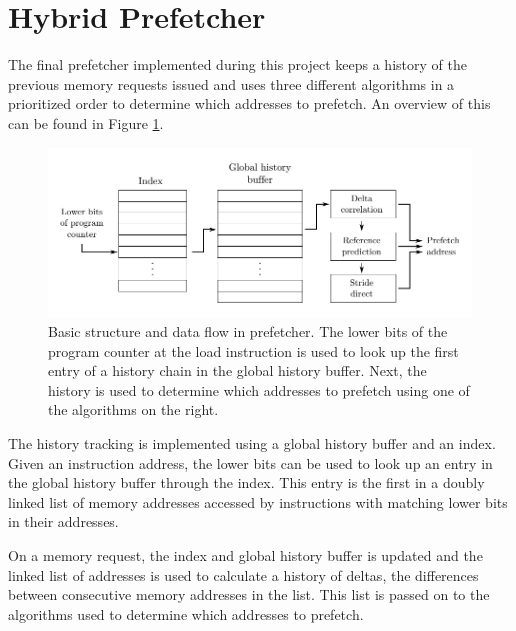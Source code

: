 \section{Hybrid Prefetcher}
\label{sec:prefetcher}

The final prefetcher implemented during this project keeps a history of the
previous memory requests issued and uses three different algorithms in a
prioritized order to determine which addresses to prefetch.
An overview of this can be found in Figure \ref{fig:prefetcher}.

\begin{figure}[h]
	\centering
	\includegraphics{images/prefetcher.pdf}
	\caption{
		Basic structure and data flow in prefetcher. The lower bits of the
		program counter at the load instruction is used to look up the first
		entry of a history chain in the global history buffer. Next, the history
		is used to determine which addresses to prefetch using one of the
		algorithms on the right.
	}
	\label{fig:prefetcher}
\end{figure}

The history tracking is implemented using a global history buffer and an index.
Given an instruction address, the lower bits can be used to look up an entry in
the global history buffer through the index.
This entry is the first in a doubly linked list of memory addresses accessed by
instructions with matching lower bits in their addresses.

On a memory request, the index and global history buffer is updated and the
linked list of addresses is used to calculate a history of deltas, the
differences between consecutive memory addresses in the list.
This list is passed on to the algorithms used to determine which addresses to
prefetch.

